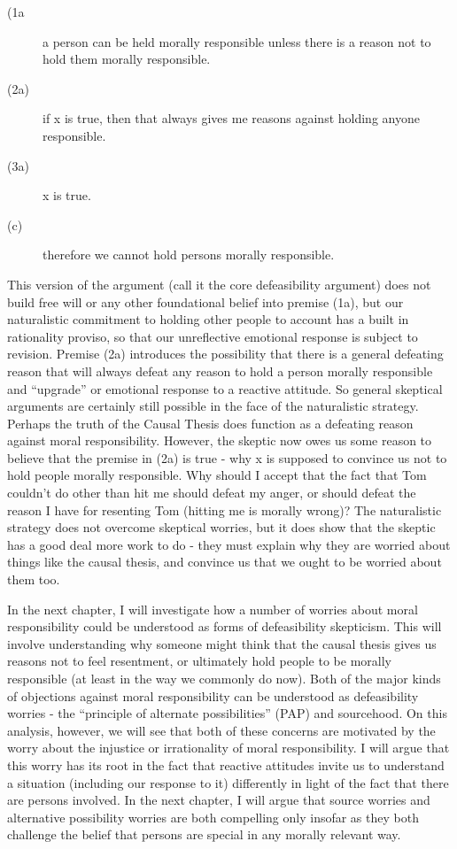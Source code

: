 \documentclass[phd,12pt,oneside,paper=letterpaper]{ubcthesis}
\begin{document}
\begin{description}
\item[(1a] a person can be held morally responsible unless there is a reason not to hold them morally responsible. 
\item[(2a)] if x is true, then that always gives me reasons against holding anyone responsible. 
\item[(3a)] x is true. 
\item[(c)] therefore we cannot hold persons morally responsible.
\end{description}

This version of the argument (call it the core defeasibility argument) does not build free will or any other foundational belief into premise (1a), but our naturalistic commitment to holding other people to account has a built in rationality proviso, so that our unreflective emotional response is subject to revision. Premise (2a) introduces the possibility that there is a general defeating reason that will always defeat any reason to hold a person morally responsible and ``upgrade'' or emotional response to a reactive attitude. So general skeptical arguments are certainly still possible in the face of the naturalistic strategy. Perhaps the truth of the Causal Thesis does function as a defeating reason against moral responsibility. However, the skeptic now owes us some reason to believe that the premise in (2a) is true - why x is supposed to convince us not to hold people morally responsible. Why should I accept that the fact that Tom couldn't do other than hit me should defeat my anger, or should defeat the reason I have for resenting Tom (hitting me is morally wrong)? The naturalistic strategy does not overcome skeptical worries, but it does show that the skeptic has a good deal more work to do - they must explain why they are worried about things like the causal thesis, and convince us that we ought to be worried about them too.  

In the next chapter, I will investigate how a number of worries about moral responsibility could be understood as forms of defeasibility skepticism. This will involve understanding why someone might think that the causal thesis gives us reasons not to feel resentment, or ultimately hold people to be morally responsible (at least in the way we commonly do now). Both of the major kinds of objections against moral responsibility can be understood as defeasibility worries - the ``principle of alternate possibilities'' (PAP) and sourcehood. On this analysis, however, we will see that both of these concerns are motivated by the worry about the injustice or irrationality of moral responsibility. I will argue that this worry has its root in the fact that reactive attitudes invite us to understand a situation (including our response to it) differently in light of the fact that there are persons involved. In the next chapter, I will argue that source worries and alternative possibility worries are both compelling only insofar as they both challenge the belief that persons are special in any morally relevant way. 
\end{document}
